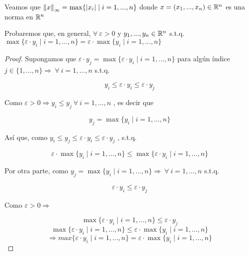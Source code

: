 \begin{theorem} \label{theom113}
    
 Veamos que  ${\norm{x}}_{\infty} = \max \{ \abs{{x}_{i}} \mid i = 1,...,n\}$ donde $x=(x_1,...,x_n) \in \mathbb{R}^n$ es una norma en $\mathbb{R}^n$

 \end{theorem}

 \begin{lemma} \label{lematarea}
    Probaremos que, en general, $\forall \: \varepsilon > 0 $ y $y_1,...,y_n \in \mathbb{R}^n$ s.t.q. $\max \{ \varepsilon \cdot y_i \mid i = 1,...,n\} = \varepsilon \cdot \max \{  y_i \mid i = 1,...,n\}$ 
\end{lemma}

\begin{proof}
    Supongamos que $\varepsilon \cdot y_j = \max \{ \varepsilon \cdot y_i \mid i = 1,...,n\}$ para algún índice $j \in \{ 1,...,n \} \Rightarrow \: \forall \: i = 1,...,n $ s.t.q.

    \begin{equation*}
        y_i \leqslant \varepsilon \cdot y_i \leqslant \varepsilon \cdot y_j
    \end{equation*}

    Como $\varepsilon > 0 \Rightarrow y_i \leqslant y_j \: \forall \:   i = 1,...,n$ , es decir que

    \begin{equation*}
        y_j = \max \{ y_i \mid i = 1,...,n\}
    \end{equation*}

    Así que, como $ y_i \leqslant y_j \leqslant \varepsilon \cdot y_i \leqslant \varepsilon \cdot y_j$ , s.t.q.

    \begin{equation*}
        \varepsilon \cdot \max \{ y_i \mid i = 1,...,n\} \leqslant \max \{ \varepsilon \cdot y_i \mid i = 1,...,n\}
    \end{equation*}

    Por otra parte, como $y_j = \max \{ y_i \mid i = 1,...,n\} \Rightarrow \: \forall \: i = 1,...,n $ s.t.q.
    
    \begin{equation*}
         \varepsilon \cdot y_i \leqslant \varepsilon \cdot y_j
    \end{equation*}

    Como $\varepsilon > 0 \Rightarrow$

    \begin{equation*}
        \max \{ \varepsilon \cdot y_i \mid i = 1,...,n\} \leqslant \varepsilon \cdot y_j 
    \end{equation*}
    \begin{equation*}
        \max \{ \varepsilon \cdot y_i \mid i = 1,...,n\} \leqslant \varepsilon \cdot \max \{ y_i \mid i = 1,...,n\} 
    \end{equation*}
    \begin{equation*}
        \Rightarrow max \{ \varepsilon \cdot y_i \mid i = 1,...,n\} = \varepsilon \cdot \max \{ y_i \mid i = 1,...,n\} 
    \end{equation*}
\end{proof}

